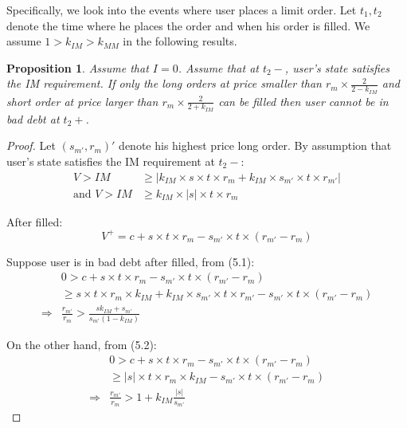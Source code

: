 \documentclass[notitlepage,reqno,11pt]{amsart}
\numberwithin{equation}{section}
\newtheorem{prop}{Proposition}[section]
\newcommand{\RA}{\Rightarrow}
\begin{document}
Specifically, we look into the events where user places a limit order. Let $t_1,t_2$ denote the time where he places the order and when his order is filled. We assume $1 > k_{IM} > k_{MM}$ in the following results. 
\begin{prop}
    Assume that $I = 0$. Assume that at $t_2-$, user's state satisfies the IM requirement. If only the long orders at price smaller than $r_m\times\frac{2}{2-k_{IM}}$ and short order at price larger than $r_m\times\frac{2}{2+k_{IM}}$ can be filled then user cannot be in bad debt at $t_2+$.
\end{prop}
\begin{proof}
Let $(s_{m'},r_m)'$ denote his highest price long order. By assumption that user's state satisfies the IM requirement at $t_2-$:
    \begin{align}
    V >  IM&\geq |k_{IM}\times s\times t\times r_m + k_{IM}\times s_{m'}\times t\times r_{m'}|\\
    \text{and } V >  IM&\geq k_{IM}\times |s|\times t\times r_m
    \end{align}

After filled:
$$
V^+ = c + s\times t\times r_m - s_{m'}\times t\times (r_{m'}-r_m)
$$


Suppose user is in bad debt after filled, from (5.1):
\begin{align*}
&0> c + s\times t\times r_m - s_{m'}\times t\times (r_{m'}-r_m) \\
&\geq s\times t\times r_m\times k_{IM} + k_{IM}\times s_{m'}\times t\times r_{m'} - s_{m'}\times t\times (r_{m'}-r_m)\\
\RA &\frac{r_{m'}}{r_m} > \frac{sk_{IM} + s_{m'}}{s_{m'}(1-k_{IM})}
\end{align*}

On the other hand, from (5.2):
\begin{align*}
&0> c + s\times t\times r_m - s_{m'}\times t\times (r_{m'}-r_m) \\
&\geq |s|\times t\times r_m\times k_{IM} - s_{m'}\times t\times (r_{m'}-r_m)\\
\RA &\frac{r_{m'}}{r_m} > 1 + k_{IM}\frac{|s|}{s_{m'}}
\end{align*}


\end{proof}
\end{document}
